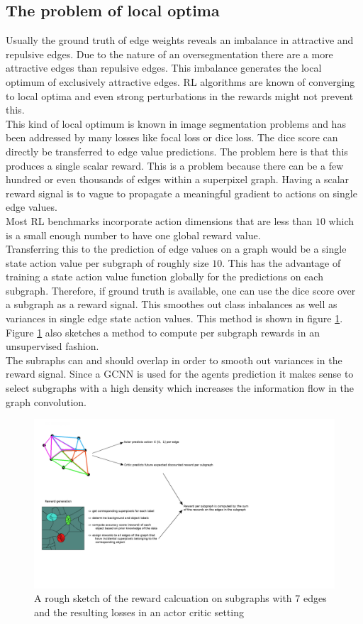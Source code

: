 \subsection{The problem of local optima}
Usually the ground truth of edge weights reveals an imbalance in attractive and repulsive edges. Due to the nature of an oversegmentation there are a more attractive edges than repulsive edges. This imbalance generates the local optimum of exclusively attractive edges. RL algorithms are known of converging to local optima and even strong perturbations in the rewards might not prevent this.\\
This kind of local optimum is known in image segmentation problems and has been addressed by many losses like focal loss or dice loss. The dice score can directly be transferred to edge value predictions. The problem here is that this produces a single scalar reward. This is a problem because there can be a few hundred or even thousands of edges within a superpixel graph. Having a scalar reward signal is to vague to propagate a meaningful gradient to actions on single edge values.\\
Most RL benchmarks incorporate action dimensions that are less than $10$ which is a small enough number to have one global reward value.\\
Transferring this to the prediction of edge values on a graph would be a single state action value per subgraph of roughly size $10$. This has the advantage of training a state action value function globally for the predictions on each subgraph. Therefore, if ground truth is available, one can use the dice score over a subgraph as a reward signal. This smoothes out class inbalances as well as variances in single edge state action values. This method is shown in figure \ref{reward_calc}. Figure \ref{reward_calc} also sketches a method to compute per subgraph rewards in an unsupervised fashion.\\
The subraphs can and should overlap in order to smooth out variances in the reward signal. Since a GCNN is used for the agents prediction it makes sense to select subgraphs with a high density which increases the information flow in the graph convolution.

\begin{figure}[ht!]
	\centering
	\includegraphics[width=1.5\textwidth]{figures/images/reward_calc_sketch.png}
	\caption{A rough sketch of the reward calcuation on subgraphs with 7 edges and the resulting losses in an actor critic setting}
	\label{reward_calc}
\end{figure}

